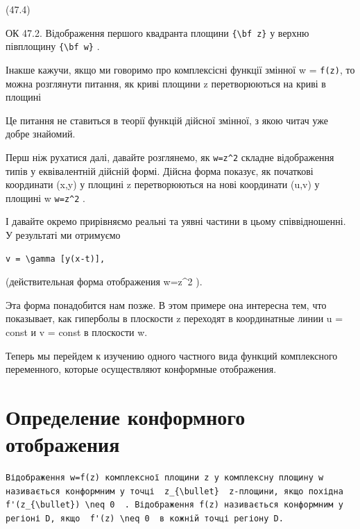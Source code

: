 \documentclass[
  ukrainian,
]{article}
\begin{document}
(47.4)

ОК 47.2. Відображення першого квадранта площини
\texttt{\{\textbackslash{}bf\ z\}} у верхню півплощину
\texttt{\{\textbackslash{}bf\ w\}} .

Інакше кажучи, якщо ми говоримо про комплексісні функції змінної w =
\texttt{f(z)}, то можна розглянути питання, як криві площини z
перетворюються на криві в площині

Це питання не ставиться в теорії функцій дійсної змінної, з якою читач
уже добре знайомий.

Перш ніж рухатися далі, давайте розглянемо, як \texttt{w=z\^{}2} складне
відображення типів у еквівалентній дійсній формі. Дійсна форма показує,
як початкові координати (x,y) у площині z перетворюються на нові
координати (u,v) у площині w \texttt{w=z\^{}2} .

І давайте окремо прирівняємо реальні та уявні частини в цьому
співвідношенні. У результаті ми отримуємо

\begin{verbatim}
v = \gamma [y(x-t)],
\end{verbatim}

(действительная форма отображения w=z\^{}2 ).

Эта форма понадобится нам позже. В этом примере она интересна тем, что
показывает, как гиперболы в плоскости z переходят в координатные линии u
= const и v = const в плоскости w.

Теперь мы перейдем к изучению одного частного вида функций комплексного
переменного, которые осуществляют конформные отображения.

\section{Определение конформного
отображения}\label{ux43eux43fux440ux435ux434ux435ux43bux435ux43dux438ux435-ux43aux43eux43dux444ux43eux440ux43cux43dux43eux433ux43e-ux43eux442ux43eux431ux440ux430ux436ux435ux43dux438ux44f}

\begin{verbatim}
Відображення w=f(z) комплексної площини z у комплексну площину w називається конформним у точці  z_{\bullet}  z-площини, якщо похідна  f'(z_{\bullet}) \neq 0  . Відображення f(z) називається конформним у регіоні D, якщо  f'(z) \neq 0  в кожній точці регіону D.
\end{verbatim}
\end{document}
